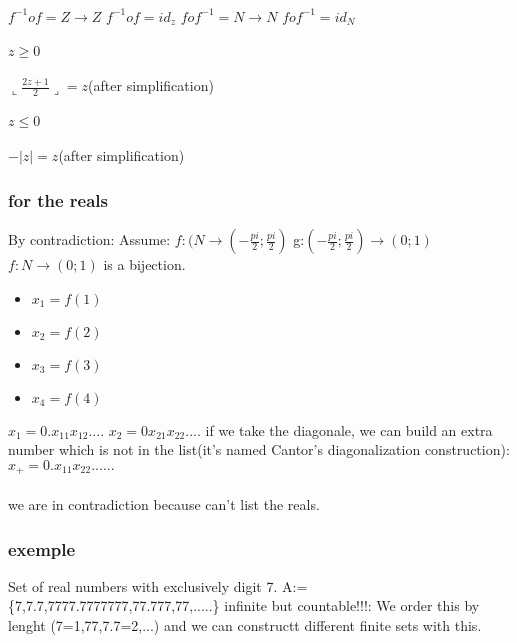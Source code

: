 \documentclass[a4paper,10pt]{article}
\begin{document}
{\paragraph{}
$f^{-1}of=Z\rightarrow Z$
\newline
$f^{-1}of=id_z$
\newline
$fof^{-1}=N\rightarrow N$
\newline
$fof^{-1}=id_N$
\paragraph{$z \geq 0$}
$\llcorner\frac{2z+1}{2}\lrcorner=z$(after simplification)
\paragraph{$z\leq 0$}
$-|z|=z$(after simplification)

\subsubsection{for the reals}
By contradiction:
\newline
Assume: $f:(N\rightarrow (-\frac{pi}{2};\frac{pi}{2})$
\newline
g:$(-\frac{pi}{2};\frac{pi}{2})\rightarrow (0;1)$
\newline
$f:N\rightarrow(0;1)$ is a bijection.
\begin{itemize}
 \item $x_1=f(1)$
 \item $x_2=f(2)$
 \item $x_3=f(3)$
 \item $x_4=f(4)$
\end{itemize}
$x_1=0.x_{11}x_{12}....$  
$x_2=0x_{21}x_{22}....$
\newline
if we take the diagonale, we can build an extra number which is not in the list(it's named Cantor's diagonalization construction):
$x_+=0.x_{11}x_{22}......$
\paragraph{}
we are in contradiction because can't list the reals.
\subsubsection{exemple}
Set of real numbers with exclusively digit 7.
\newline
A:=\{7,7.7,7777.7777777,77.777,77,.....\}
\newline
infinite but countable!!!:
\newline
We order this by lenght (7=1,77,7.7=2,...) and we can constructt different finite sets with this.
}
\end{document}
